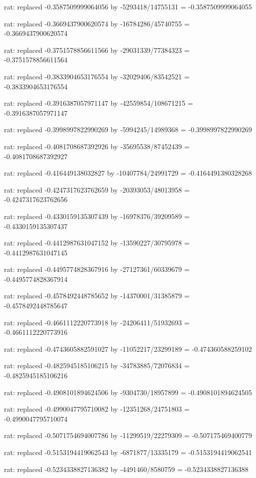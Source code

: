 \documentclass[a4paper,10pt]{article}
\begin{document}
\begin{eulernotebook}
\begin{eulercomment}
\begin{eulercomment}
\begin{eulercomment}
\begin{eulercomment}
\begin{eulercomment}
\begin{eulercomment}
\begin{eulercomment}
\begin{eulercomment}
\begin{eulercomment}
\begin{eulercomment}
\begin{eulercomment}
\begin{eulercomment}
\begin{eulercomment}
\begin{eulercomment}
\begin{eulercomment}
\begin{eulercomment}
\begin{euleroutput}
  rat: replaced -0.3587509999064056 by -5293418/14755131 = -0.3587509999064055
  
  rat: replaced -0.3669437900620574 by -16784286/45740755 = -0.3669437900620574
  
  rat: replaced -0.3751578856611566 by -29031339/77384323 = -0.3751578856611564
  
  rat: replaced -0.3833904653176554 by -32029406/83542521 = -0.3833904653176554
  
  rat: replaced -0.3916387057971147 by -42559854/108671215 = -0.3916387057971147
  
  rat: replaced -0.3998997822990269 by -5994245/14989368 = -0.3998997822990269
  
  rat: replaced -0.4081708687392926 by -35695538/87452439 = -0.4081708687392927
  
  rat: replaced -0.416449138032827 by -10407784/24991729 = -0.4164491380328268
  
  rat: replaced -0.4247317623762659 by -20393053/48013958 = -0.4247317623762656
  
  rat: replaced -0.4330159135307439 by -16978376/39209589 = -0.4330159135307437
  
  rat: replaced -0.4412987631047152 by -13590227/30795978 = -0.4412987631047145
  
  rat: replaced -0.4495774828367916 by -27127361/60339679 = -0.4495774828367914
  
  rat: replaced -0.4578492448785652 by -14370001/31385879 = -0.4578492448785647
  
  rat: replaced -0.4661112220773918 by -24206411/51932693 = -0.4661112220773916
  
  rat: replaced -0.4743605882591027 by -11052217/23299189 = -0.474360588259102
  
  rat: replaced -0.4825945185106215 by -34783885/72076834 = -0.4825945185106216
  
  rat: replaced -0.4908101894624506 by -9304730/18957899 = -0.4908101894624505
  
  rat: replaced -0.4990047795710082 by -12351268/24751803 = -0.4990047795710074
  
  rat: replaced -0.5071754694007786 by -11299519/22279309 = -0.507175469400779
  
  rat: replaced -0.5153194419062543 by -6871877/13335179 = -0.5153194419062541
  
  rat: replaced -0.5234338827136382 by -4491460/8580759 = -0.5234338827136388
  

\end{euleroutput}
\end{eulercomment}
\end{eulercomment}
\end{eulercomment}
\end{eulercomment}
\end{eulercomment}
\end{eulercomment}
\end{eulercomment}
\end{eulercomment}
\end{eulercomment}
\end{eulercomment}
\end{eulercomment}
\end{eulercomment}
\end{eulercomment}
\end{eulercomment}
\end{eulercomment}
\end{eulercomment}
\end{eulernotebook}
\end{document}
